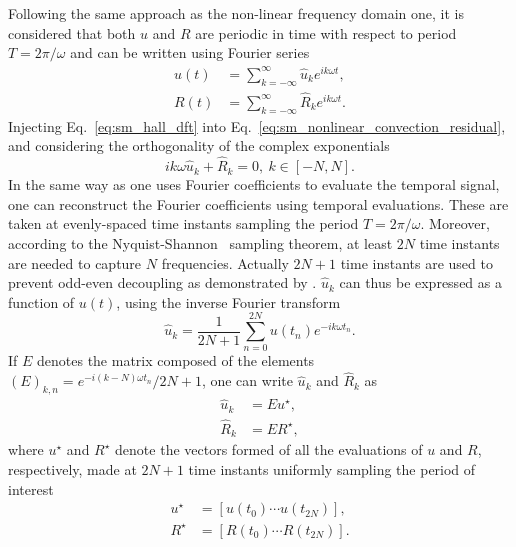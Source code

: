 Following the same approach as the non-linear frequency domain one,
it is considered that both $u$ and $R$ are periodic
in time with respect to period $T = 2 \pi / \omega$
and can be written using Fourier series
\begin{equation}
	\begin{split}
		u(t) &= \sum_{k=-\infty}^{\infty} \widehat{u}_k e^{i k \omega t}, \\
		R(t) &= \sum_{k=-\infty}^{\infty} \widehat{R}_k e^{i k \omega t}.
		\label{eq:sm_hall_dft}
	\end{split}
\end{equation}
Injecting Eq.~\eqref{eq:sm_hall_dft} into 
Eq.~\eqref{eq:sm_nonlinear_convection_residual}, and considering
the orthogonality of the complex exponentials
\begin{equation}
	i k \omega \widehat{u}_k + \widehat{R}_k = 0, \: k \in [-N, N].
	\label{eq:sm_hall_frequential_eq}
\end{equation}
In the same way as one uses Fourier coefficients to
evaluate the temporal signal,
one can reconstruct the Fourier coefficients using
temporal evaluations. These are taken at evenly-spaced time instants
sampling the period $T = 2 \pi / \omega$. Moreover, 
according to the Nyquist-Shannon~\cite{Shannon1949} sampling theorem, 
at least $2N$ time instants are needed to capture $N$ frequencies. Actually
$2N+1$ time instants are used to prevent odd-even decoupling as
demonstrated by \citet{Weide2005}. $\widehat{u}_k$ can thus
be expressed as a function of $u(t)$, using the inverse
Fourier transform
\begin{equation}
	\widehat{u}_k = \frac{1}{2N+1} 
	\sum_{n=0}^{2N} u(t_n) e^{-i k \omega t_n}.
\end{equation}
If $E$ denotes the matrix composed of the elements 
$(E)_{k,n} = e^{-i (k - N) \omega t_n} / 2N+1$, one can write $\widehat{u}_k$
and $\widehat{R}_k$ as
\begin{equation}
	\begin{split}
		\widehat{u}_k &= E u^\star, \\
		\widehat{R}_k &= E R^\star,
	\end{split}
	\label{eq:sm_matrix_fourier_operator}
\end{equation}
where $u^\star$ and $R^\star$ 
denote the vectors formed of all the evaluations of $u$
and $R$, respectively,
made at $2N+1$ time instants uniformly sampling the period of interest
\begin{equation}
	\begin{split}
		u^\star &= [u(t_0) \cdots u(t_{2N})], \\
		R^\star &= [R(t_0) \cdots R(t_{2N})].
	\end{split}
\end{equation}
